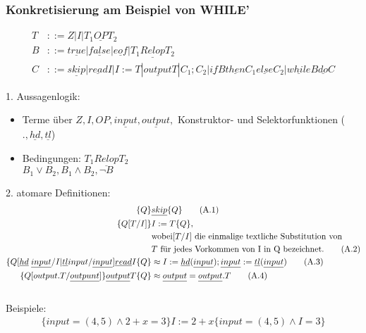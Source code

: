 \subsubsection{Konkretisierung am Beispiel von WHILE'}
\begin{align*}
T&::= Z | I | T_1 \underline{OP} T_2\\
B&::= \underline{true} | \underline{false} | \underline{eof} | T_1 \underline{Relop} T_2\\
C&::= \underline{skip} | \underline{read} I | I:=T | \underline{output} T | C_1;C_2 | \underline{if}B\underline{then}C_1\underline{else}C_2|\underline{while}B\underline{do}C
\end{align*}
\begin{compactitem}
	\item[1.] Aussagenlogik:
	\begin{itemize}
		\item Terme über $Z, I, OP, \underline{input}, \underline{output},$ Konstruktor- und Selektorfunktionen ($., \underline{hd}, \underline{tl}$)
		\item Bedingungen: $T_1 \underline{Relop} T_2$\\
		$B_1 \lor B_2, B_1 \land B_2, \lnot B$ 
	\end{itemize}
	\item[2.] atomare Definitionen:\\
		\begin{align}
			\{Q\}&\underline{skip}\{Q\}\tag{A.1}\\
			\{Q[T/I]\}&I:=T\{Q\},\notag\\&\text{wobei}[T/I]\text{ die einmalige textliche Substitution von} \notag\\&T \text{ für jedes Vorkommen von I in Q bezeichnet.}\tag{A.2}\\
			\{Q[\underline{hd} \; \underline{input}/I | \underline{tl} input / \underline{input}]\underline{read} I \{Q\} &\approx I:= \underline{hd}(\underline{
			input}); \underline{input} := \underline{tl} (\underline{input}) \tag{A.3}\\
			\{Q[output.T / \underline{outpunt}]\} \underline{output}T \{Q\} &\approx \underline{output}=\underline{output}.T\tag{A.4}\\
			\notag
		\end{align}
		Beispiele:
		\begin{align*}
		\{input=(4,5)\land2+x=3\} I:=2+x \{input=(4,5)\land I=3\}
		\end{align*}
		\begin{align*}

\end{align*}
\end{compactitem}
